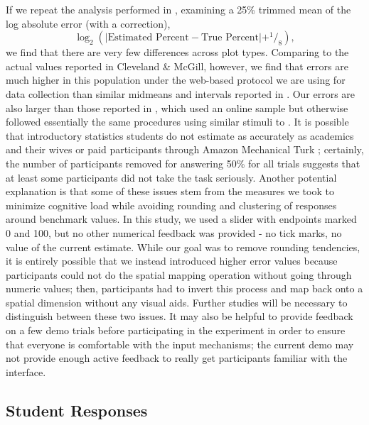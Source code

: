 \documentclass[runningheads
]{llncs}
\begin{document}
If we repeat the analysis performed in
\textcite{clevelandGraphicalPerceptionTheory1984}, examining a 25\%
trimmed mean of the log absolute error (with a correction),
\[\log_2\left(\left| \text{Estimated Percent} - \text{True Percent}\right| + ^1\!\!/_8\right),\]
we find that there are very few differences across plot types. Comparing
to the actual values reported in Cleveland \& McGill, however, we find
that errors are much higher in this population under the web-based
protocol we are using for data collection than similar midmeans and
intervals reported in \textcite{clevelandGraphicalPerceptionTheory1984}.
Our errors are also larger than those reported in
\textcite{heerCrowdsourcingGraphicalPerception2010}, which used an
online sample but otherwise followed essentially the same procedures
using similar stimuli to
\textcite{clevelandGraphicalPerceptionTheory1984}. It is possible that
introductory statistics students do not estimate as accurately as
academics and their wives
\autocite{clevelandGraphicalPerceptionTheory1984} or paid participants
through Amazon Mechanical Turk
\autocite{heerCrowdsourcingGraphicalPerception2010}; certainly, the
number of participants removed for answering 50\% for all trials
suggests that at least some participants did not take the task
seriously. Another potential explanation is that some of these issues
stem from the measures we took to minimize cognitive load while avoiding
rounding and clustering of responses around benchmark values. In this
study, we used a slider with endpoints marked 0 and 100, but no other
numerical feedback was provided - no tick marks, no value of the current
estimate. While our goal was to remove rounding tendencies, it is
entirely possible that we instead introduced higher error values because
participants could not do the spatial mapping operation without going
through numeric values; then, participants had to invert this process
and map back onto a spatial dimension without any visual aids. Further
studies will be necessary to distinguish between these two issues. It
may also be helpful to provide feedback on a few demo trials before
participating in the experiment in order to ensure that everyone is
comfortable with the input mechanisms; the current demo may not provide
enough active feedback to really get participants familiar with the
interface.

\hypertarget{student-responses}{%
\subsection{Student Responses}\label{student-responses}}
\end{document}
